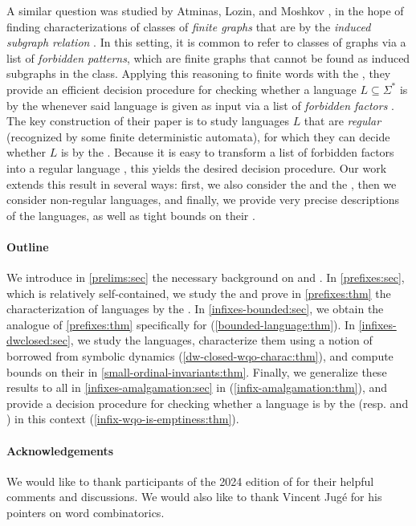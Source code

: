 A similar question was studied by Atminas, Lozin, and Moshkov \cite{ALM17}, in
the hope of finding characterizations of classes of \emph{finite graphs} that
are  by the \emph{induced subgraph relation}
\cite[Section 7]{ALM17}. In this setting, it is common to refer to classes of
graphs via a list of \emph{forbidden patterns}, which are finite graphs that
cannot be found as induced subgraphs in the class. Applying this reasoning to
finite words with the , they provide an efficient decision
procedure for checking whether a language $L \subseteq \Sigma^*$ is
 by the  whenever said language is
given as input via a list of \emph{forbidden factors} \cite[Theorem 1, Theorem
2]{ALM17}. The key construction of their paper is to study languages $L$ that
are \emph{regular} (recognized by some finite deterministic automata), for
which they can decide whether $L$ is  by the  \cite[Theorem 1]{ALM17}. Because it is easy to transform a list of
forbidden factors into a regular language \cite[Theorem 1]{ALM17}, this yields
the desired decision procedure. Our work extends this result in several ways:
first, we also consider the  and the ,
then we consider non-regular languages, and finally, we provide very precise
descriptions of the  languages, as well as tight bounds
on their . 

\paragraph*{Outline} We introduce in \cref{prelims:sec} the necessary
background on  and . In
\cref{prefixes:sec}, which is relatively self-contained, we study the
 and prove in \cref{prefixes:thm} the characterization of
 languages by the . In
\cref{infixes-bounded:sec}, we obtain the  analogue
of \cref{prefixes:thm} specifically for 
(\cref{bounded-language:thm}). In \cref{infixes-dwclosed:sec}, we study the
 languages, characterize them using a notion of
 borrowed from symbolic dynamics
(\cref{dw-closed-wqo-charac:thm}), and compute bounds on their  in \cref{small-ordinal-invariants:thm}. Finally, we generalize
these results to all  in
\cref{infixes-amalgamation:sec} in (\cref{infix-amalgamation:thm}), and provide
a decision procedure for checking whether a language is 
by the  (resp.  and ) in this context
(\cref{infix-wqo-is-emptiness:thm}).

\paragraph*{Acknowledgements} We would like to thank participants of the 2024
edition of  for their helpful comments and discussions.
We would also like to thank Vincent Jugé for his pointers on word combinatorics.
